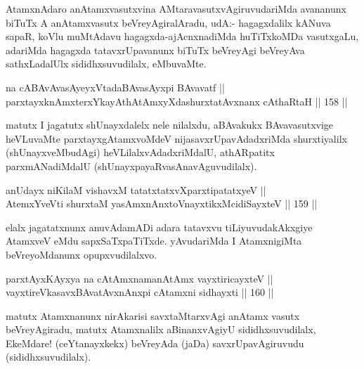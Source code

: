 \begin{artha}
AtamxnAdaro anAtamxvasutxvina AMtaravasutxvAgiruvudariMda avananunx
biTuTx A anAtamxvasutx beVreyAgiralAradu,  udA:- hagagxdalilx kANuva
sapaR, koVlu muMtAdavu hagagxda-ajAcnxnadiMda huTiTxkoMDa vasutxgaLu,
adariMda hagagxda tatavxrUpavanunx biTuTx beVreyAgi beVreyAva
sathxLadalUlx sididhxsuvudilalx, eMbuvaMte.
\end{artha}


\begin{shl}
na cABAvAvasAyeyxVtadaBAvasAyxpi BAvavatf || \\
parxtayxknAmxterxYkayAthAtAmxyXdashurxtatAvxnanx cAthaRtaH \hfill || 158 ||  
\end{shl}

\begin{artha}
matutx I jagatutx shUnayxdalelx nele nilalxdu, aBAvakukx
BAvavasutxvige heVLuvaMte parxtayxgAtamxvoMdeV nijasavxrUpavAdadxriMda
shurxtiyalilx (shUnayxveMbudAgi) heVLilalxvAdadxriMdalU, athARpatitx
parxmANadiMdalU (shUnayxpayaRvasAnavAguvudilalx).
\end{artha}

\begin{shl}
anUdayx niKilaM vishavxM tatatxtatxvXparxtipatatxyeV || \\
AtemxYveVti shurxtaM yasAmxnAnxtoV\s nayxtikxMcidiSayxteV \hfill || 159 ||  
\end{shl}

\begin{artha}
elalx jagatatxnunx anuvAdamADi adara tatavxvu tiLiyuvudakAkxgiye
AtamxveV eMdu sapxSaTxpaTiTxde. yAvudariMda I AtamxnigiMta
beVreyoMdanunx opupxvudilalxvo.
\end{artha}

\begin{shl}
parxtAyxKAyxya na cA\s \s tAmxnamanAtAmx vayxtiricayxteV || \\
vayxtireVkasavxBAvatAvxnAnxpi cA\s \s tamxni sidhayxti \hfill || 160 ||  
\end{shl}

\begin{artha}
matutx Atamxnanunx nirAkarisi savxtaMtarxvAgi anAtamx vasutx
beVreyAgiradu, matutx Atamxnalilx aBinanxvAgiyU sididhxsuvudilalx,
EkeMdare! (ceYtanayxkekx) beVreyAda (jaDa) savxrUpavAgiruvudu (sididhxsuvudilalx).
\end{artha}

